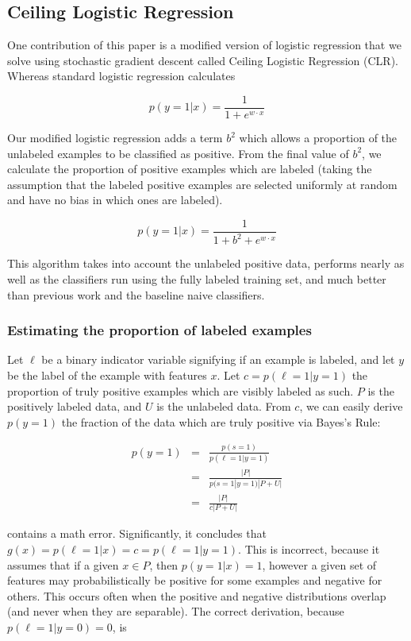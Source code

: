 \documentclass{article}
\begin{document}
\subsection{Ceiling Logistic Regression}

One contribution of this paper is a modified version of logistic regression that we solve using stochastic gradient descent called Ceiling Logistic Regression (CLR).  Whereas standard logistic regression calculates

$$ p(y=1|x) = \frac{1}{1 + e^{w \cdot x}} $$

Our modified logistic regression adds a term $b^2$ which allows a proportion of the unlabeled examples to be classified as positive. From the final value of $b^2$, we calculate the proportion of positive examples which are labeled (taking the assumption that the labeled positive examples are selected uniformly at random and have no bias in which ones are labeled).

$$ p(y=1|x) = \frac{1}{1 + b^2 + e^{w \cdot x}} $$

This algorithm takes into account the unlabeled positive data, performs nearly as well as the classifiers run using the fully labeled training set, and much better than previous work and the baseline naive classifiers.

\subsubsection{Estimating the proportion of labeled examples}

Let $\ell$ be a binary indicator variable signifying if an example is labeled, and let $y$ be the label of the example with features $x$. Let $c = p(\ell=1|y=1)$ the proportion of truly positive examples which are visibly labeled as such. $P$ is the positively labeled data, and $U$ is the unlabeled data. From $c$, we can easily derive $p(y=1)$ the fraction of the data which are truly positive via Bayes's Rule:

\begin{eqnarray*}
p(y=1) &=& \frac{p(s=1)}{p(\ell = 1|y = 1)} \\
 &=&  \frac{|P|}{p(s = 1|y = 1)|P+U|} \\
 &=& \frac{|P|}{c|P+U|}
\end{eqnarray*}

\cite{elkan08} contains a math error.  Significantly, it concludes that $g(x) = p(\ell=1|x) = c = p(\ell=1|y=1)$. This is incorrect, because it assumes that if a given $x \in P$, then $p(y=1|x) = 1$, however a given set of features may probabilistically be positive for some examples and negative for others. This occurs often when the positive and negative distributions overlap (and never when they are separable). The correct derivation, because $p(\ell=1|y=0)=0$, is
\end{document}
